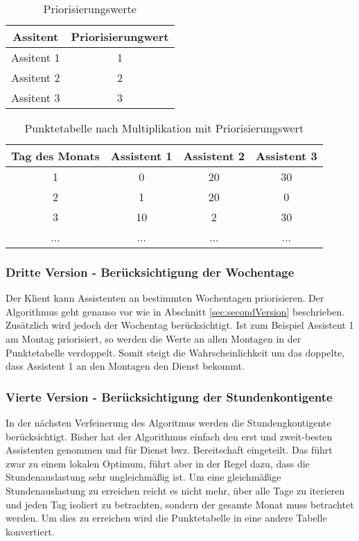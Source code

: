 \documentclass[12pt,a4paper,titlepage]{article} %
\begin{document}
\begin{table}[htb]
\centering
\begin{tabular}{|c|c|}
\hline 
Assitent & Priorisierungwert \\ 
\hline 
Assitent 1 & 1 \\ 
\hline 
Assitent 2 & 2 \\ 
\hline 
Assitent 3 & 3 \\ 
\hline 
\end{tabular} 
\caption{Priorisierungswerte}
\label{tab:teamMemberPriorities}
\end{table}

\begin{table}[htb]
\centering
\begin{tabular}{|c|c|c|c|}
\hline 
Tag des Monats & Assistent 1 & Assistent 2 & Assistent 3 \\ 
\hline 
1 & 0 & 20 & 30 \\ 
\hline 
2 & 1 & 20 & 0 \\ 
\hline 
3 & 10 & 2 & 30 \\ 
\hline 
... & ... & ... & ... \\ 
\hline 
\end{tabular}
\caption{Punktetabelle nach Multiplikation mit Priorisierungswert}
\label{tab:scoreTable2}
\end{table}

\subsubsection{Dritte Version - Berücksichtigung der Wochentage}
Der Klient kann Assistenten an bestimmten Wochentagen priorisieren. %
Der Algorithmus geht genauso vor wie in Abschnitt \ref{sec:secondVersion} beschrieben. Zusätzlich wird jedoch der Wochentag berücksichtigt. Ist zum Beispiel Assistent 1 am Montag priorisiert, so werden die Werte an allen Montagen in der Punktetabelle verdoppelt. Somit steigt die Wahrscheinlichkeit um das doppelte, dass Assistent 1 an den Montagen den Dienst bekommt.

\subsubsection{Vierte Version - Berücksichtigung der Stundenkontigente}
In der nächsten Verfeinerung des Algoritmus werden die Stundengkontigente berücksichtigt. Bisher hat der Algorithmus einfach den erst und zweit-besten Assistenten genommen und für Dienst bwz. Bereitschaft eingeteilt. Das führt zwar zu einem lokalen Optimum, führt aber in der Regel dazu, dass die Stundenauslastung sehr ungleichmäßig ist. Um eine gleichmäßige Stundenauslastung zu erreichen reicht es nicht mehr, über alle Tage zu iterieren und jeden Tag isoliert zu betrachten, sondern der gesamte Monat muss betrachtet werden.
Um dies zu erreichen wird die Punktetabelle in eine andere Tabelle konvertiert.
\end{document}
